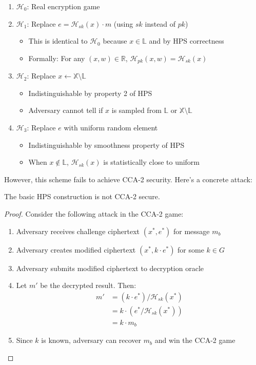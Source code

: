 \begin{enumerate}
    \item $\mathcal{H}_0$: Real encryption game
    \item $\mathcal{H}_1$: Replace $e = \mathcal{H}_{sk}(x) \cdot m$ (using $sk$ instead of $pk$)
        \begin{itemize}
            \item This is identical to $\mathcal{H}_0$ because $x \in \mathbb{L}$ and by HPS correctness
            \item Formally: For any $(x,w) \in \mathbb{R}$, $\mathcal{H}_{pk}(x,w) = \mathcal{H}_{sk}(x)$
        \end{itemize}
    \item $\mathcal{H}_2$: Replace $x \leftarrow \mathbb{X} \setminus \mathbb{L}$ 
        \begin{itemize}
            \item Indistinguishable by property 2 of HPS
            \item Adversary cannot tell if $x$ is sampled from $\mathbb{L}$ or $\mathbb{X} \setminus \mathbb{L}$
        \end{itemize}
    \item $\mathcal{H}_3$: Replace $e$ with uniform random element
        \begin{itemize}
            \item Indistinguishable by smoothness property of HPS
            \item When $x \not\in \mathbb{L}$, $\mathcal{H}_{sk}(x)$ is statistically close to uniform
        \end{itemize}
\end{enumerate}

However, this scheme fails to achieve CCA-2 security. Here's a concrete attack:

\begin{theorem}
The basic HPS construction is not CCA-2 secure.
\end{theorem}

\begin{proof}
Consider the following attack in the CCA-2 game:
\begin{enumerate}
    \item Adversary receives challenge ciphertext $(x^*, e^*)$ for message $m_b$
    \item Adversary creates modified ciphertext $(x^*, k \cdot e^*)$ for some $k \in G$
    \item Adversary submits modified ciphertext to decryption oracle
    \item Let $m'$ be the decrypted result. Then:
    \begin{align*}
        m' &= (k \cdot e^*)/\mathcal{H}_{sk}(x^*) \\
        &= k \cdot (e^*/\mathcal{H}_{sk}(x^*)) \\
        &= k \cdot m_b
    \end{align*}
    \item Since $k$ is known, adversary can recover $m_b$ and win the CCA-2 game
\end{enumerate}
\end{proof}

